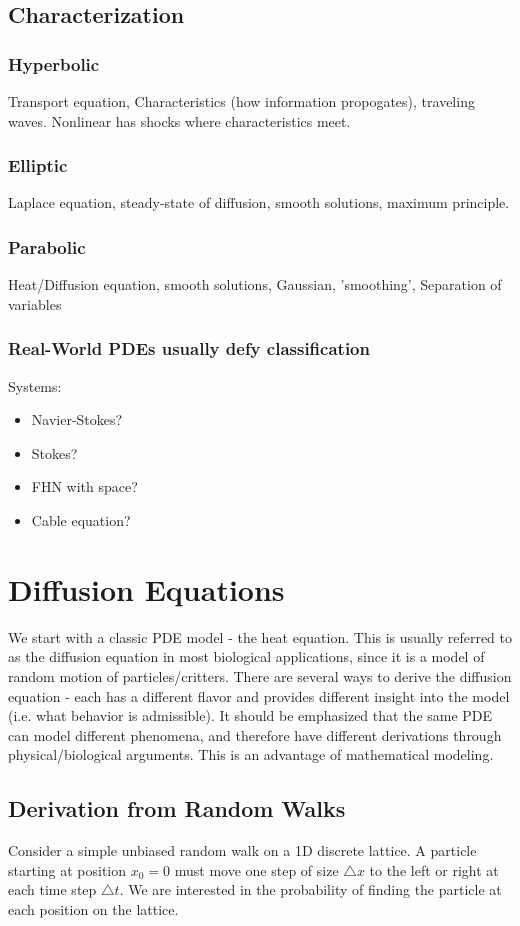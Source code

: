 \documentclass[]{article}
\numberwithin{equation}{section}		%
\newcommand{\delx}{\triangle{}x}
\newcommand{\delt}{\triangle{}t}
\begin{document}
\subsection{Characterization}
\subsubsection{Hyperbolic}
Transport equation, Characteristics (how information propogates), traveling waves.
Nonlinear has shocks where characteristics meet.
\subsubsection{Elliptic}
Laplace equation, steady-state of diffusion, smooth solutions, maximum principle. 
\subsubsection{Parabolic}
Heat/Diffusion equation, smooth solutions, Gaussian, 'smoothing', Separation of variables

\subsubsection{Real-World PDEs usually defy classification}
Systems: 
\begin{itemize}
\item Navier-Stokes?
\item Stokes?
\item FHN with space?
\item Cable equation?
\end{itemize}

\section{Diffusion Equations}
We start with a classic PDE model - the heat equation. This is usually referred to as the diffusion equation in most biological applications, since it is a model of random motion of particles/critters. There are several ways to derive the diffusion equation - each has a different flavor and provides different insight into the model (i.e. what behavior is admissible). It should be emphasized that the same PDE can model different phenomena, and therefore have different derivations through physical/biological arguments. This is an advantage of mathematical modeling.

\subsection{Derivation from Random Walks}
Consider a simple unbiased random walk on a 1D discrete lattice. A particle
starting at position $x_0=0$ must move one step of size $\delx$ to the
left or right at each time step $\delt$. We are interested in the probability of
finding the particle at each position on the lattice.
\end{document}
